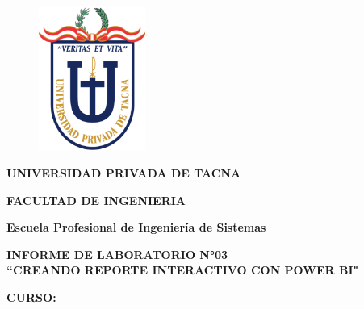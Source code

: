 \documentclass[12pt,letterpaper]{article}
\begin{document}
    \begin{titlepage}
        \begin{center}
            \begin{figure}[htb]
                \begin{center}
                    \includegraphics[width=3.5cm]{./img/logo}
                \end{center}
            \end{figure}
            \vspace*{0.15in}
            \begin{Large}
                \textbf{UNIVERSIDAD PRIVADA DE TACNA}\\
            \end{Large}
            \vspace*{0.15in}
            \begin{Large}
                \textbf{FACULTAD DE INGENIERIA} \\
            \end{Large}
            \vspace*{0.1in}
            \begin{Large}
                \textbf{Escuela Profesional de Ingeniería de Sistemas} \\
            \end{Large}
            \vspace*{0.3in}
            \begin{Large}
                \textbf{INFORME DE LABORATORIO N°03}\\
                \textbf{``CREANDO REPORTE INTERACTIVO CON POWER BI"}\\
            \end{Large}
            \vspace*{0.2in}
            \begin{Large}
                \textbf{CURSO:} \\
            \end{Large}
            \vspace*{0.1in}
            \begin{large}

\end{large}
\end{center}
\end{titlepage}
\end{document}
